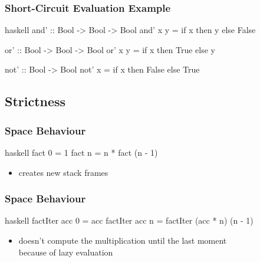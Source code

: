 \documentclass[dvipsnames]{beamer}
\theoremstyle{plain}
\begin{document}
\begin{frame}[fragile]
  \frametitle{Short-Circuit Evaluation Example}

  \begin{exampleblock}{}
    \begin{pygments}{haskell}
and' :: Bool -> Bool -> Bool
and' x y = if x then y else False

or' :: Bool -> Bool -> Bool
or' x y = if x then True else y

not' :: Bool -> Bool
not' x = if x then False else True
    \end{pygments}
  \end{exampleblock}
\end{frame}

\subsection{Strictness}

\begin{frame}[fragile]
  \frametitle{Space Behaviour}

  \begin{exampleblock}{}
    \begin{pygments}{haskell}
fact 0 = 1
fact n = n * fact (n - 1)
    \end{pygments}
  \end{exampleblock}

  \begin{itemize}
    \item creates new stack frames
  \end{itemize}
\end{frame}

\begin{frame}[fragile]
  \frametitle{Space Behaviour}

  \begin{exampleblock}{}
    \begin{pygments}{haskell}
factIter acc 0 = acc
factIter acc n = factIter (acc * n) (n - 1)
    \end{pygments}
  \end{exampleblock}

  \begin{itemize}
    \item doesn't compute the multiplication until the last moment\\
      because of lazy evaluation
  \end{itemize}
\end{frame}
\end{document}
